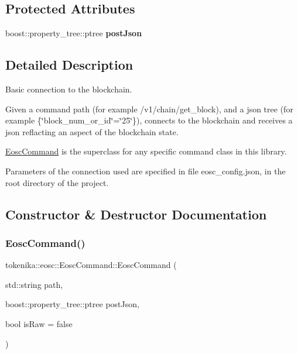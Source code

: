 \subsection*{Protected Attributes}
\begin{DoxyCompactItemize}
\item 
\mbox{\label{classtokenika_1_1eosc_1_1_eosc_command_a1642782c91f4877a8fba395324fb7337}} 
boost\+::property\+\_\+tree\+::ptree {\bfseries post\+Json}
\end{DoxyCompactItemize}


\subsection{Detailed Description}
Basic connection to the blockchain. 

Given a command path (for example {\ttfamily /v1/chain/get\+\_\+block}), and a json tree (for example \{\char`\"{}block\+\_\+num\+\_\+or\+\_\+id\char`\"{}=\char`\"{}25\char`\"{}\}), connects to the blockchain and receives a json reflacting an aspect of the blockchain state.

{\ttfamily \hyperlink{classtokenika_1_1eosc_1_1_eosc_command}{Eosc\+Command}} is the superclass for any specific command class in this library.

Parameters of the connection used are specified in file {\ttfamily eosc\+\_\+config.\+json}, in the root directory of the project. 

\subsection{Constructor \& Destructor Documentation}
\mbox{\label{classtokenika_1_1eosc_1_1_eosc_command_ab736f0dcd8ca14eb0daf9b2244218397}} 
\subsubsection{\texorpdfstring{Eosc\+Command()}{EoscCommand()}}
{\footnotesize\ttfamily tokenika\+::eosc\+::\+Eosc\+Command\+::\+Eosc\+Command (\begin{DoxyParamCaption}\item[{std\+::string}]{path,  }\item[{boost\+::property\+\_\+tree\+::ptree}]{post\+Json,  }\item[{bool}]{is\+Raw = {\ttfamily false} }\end{DoxyParamCaption})\hspace{0.3cm}{\ttfamily [inline]}}



